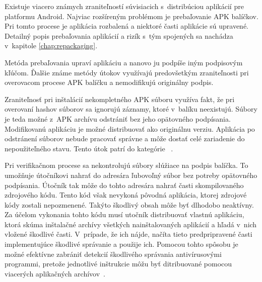 Existuje viacero známych zraniteľností súvisiacich s~distribúciou aplikácií  pre platformu Android. Najviac rozšíreným problémom je prebaľovanie APK balíčkov. Pri tomto procese je aplikácia rozbalená a niektoré časti aplikácie sú upravené. Detailný popis prebaľovania aplikácií a rizík s~tým spojených sa nachádza v~kapitole \ref{chap:repackaging}.

Metóda prebaľovania upraví aplikáciu a nanovo ju podpíše iným podpisovým kľúčom. Ďalšie známe metódy útokov využívajú predovšetkým zraniteľnosti pri overovacom procese APK balíčku a nemodifikujú originálny podpis. 

Zraniteľnosť pri inštalácií nekompletného APK súboru využíva fakt, že pri overovaní hashov súborov sa ignorujú záznamy, ktoré v~balíku neexistujú. Súbory je teda možné z~APK archívu odstrániť bez jeho opätovného podpísania. Modifikovanú aplikáciu je možné distribuovať ako originálnu verziu. Aplikácia po odstránení súborov nebude pracovať správne a môže dostať celé zariadenie do nepoužiteľného stavu. Tento útok patrí do kategórie ~\cite{A7idcou1z6WqKvQZ}.

Pri verifikačnom procese sa nekontrolujú súbory slúžiace na podpis balíčka. To umožňuje útočníkovi nahrať do adresára  ľubovoľný súbor bez potreby opätovného podpísania. Útočník tak môže do tohto adresára nahrať časti skompilovaného zdrojového kódu. Tento kód však nevykoná pôvodná aplikácia, ktorej zdrojové kódy zostali nepozmenené. Takýto škodlivý obsah môže byť dlhodobo neaktívny. Za účelom vykonania tohto kódu musí utočník distribuovať vlastnú aplikáciu, ktorá skúma inštalačné archívy všetkých nainštalovaných aplikácií a hľadá v~nich vložené škodlivé časti. V~prípade, že ich nájde, načíta tieto predpripravené časti implementujúce škodlivé správanie a použije ich. Pomocou tohto spôsobu je možné efektívne zabrániť detekcií škodlivého správania antivírusovými programmi, pretože jednotlivé inštrukcie môžu byť ditribuované pomocou viacerých aplikačných archívov~\cite{A7idcou1z6WqKvQZ}.
